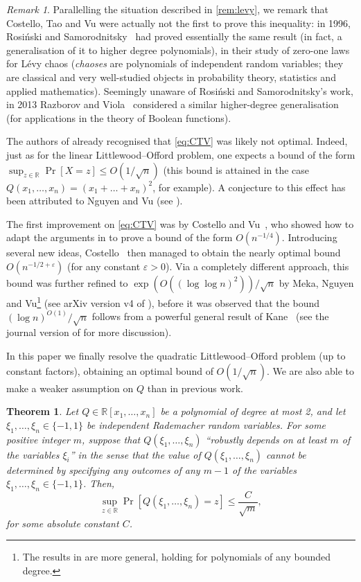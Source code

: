 \documentclass[english]{article}
\newtheorem{theorem}{Theorem}[section]
\theoremstyle{remark}
\newtheorem{remark}{Remark}[section]
\numberwithin{equation}{section}
\numberwithin{figure}{section}
\newcommand{\RR}{\mathbb{R}}
\begin{document}
\begin{remark}\label{rem:RS}
Parallelling the situation described in \cref{rem:levy}, we remark that Costello,
Tao and Vu were actually not the first to prove this inequality: in
1996, Rosi\'nski and Samorodnitsky~\cite{RS96} had proved essentially
the same result (in fact, a generalisation of it to higher degree
polynomials), in their study of zero-one laws for L\'evy chaos (\emph{chaoses} are polynomials of independent random variables; they are classical and very well-studied objects in probability theory, statistics and applied mathematics). Seemingly unaware of
Rosi\'nski and Samorodnitsky's work, in 2013 Razborov and Viola~\cite{RV13}
considered a similar higher-degree generalisation (for applications in the theory of Boolean functions).
\end{remark}

The authors of \cite{CTV06,RS96} already recognised that \cref{eq:CTV} was likely not optimal. Indeed, just as for the linear Littlewood--Offord problem, one expects a bound of the form $\sup_{z\in\RR}\Pr[X=z]\le O(1/\sqrt{n})$ (this bound is attained in the case $Q(x_{1},\dots,x_{n})=(x_{1}+\dots+x_{n})^{2}$, for example). A conjecture to this effect has been attributed to Nguyen and Vu (see \cite{MNV16,RV13}).

The first improvement on \cref{eq:CTV} was by Costello and Vu~\cite{CV08}, who showed how to adapt the arguments in \cite{CTV06} to prove a bound of the form $O(n^{-1/4})$. Introducing several new ideas, Costello~\cite{Cos13} then managed to obtain the nearly optimal bound $O(n^{-1/2+\varepsilon})$ (for
any constant $\varepsilon>0$). Via a completely different approach, this bound was further refined to
$\exp(O((\log\log n)^{2}))/\sqrt{n}$ by Meka, Nguyen and Vu\footnote{The results in \cite{MNV16} are more general, holding for polynomials of any bounded degree.} (see arXiv version v4 of \cite{MNV16}), before it was observed that the bound $(\log n)^{O(1)}/\sqrt{n}$ follows from a powerful general result of Kane~\cite{Kan14} (see the journal version of \cite{MNV16} for more discussion).

In this paper we finally resolve the quadratic Littlewood--Offord problem (up to constant factors), obtaining an optimal bound of $O(1/\sqrt{n})$. We are also able to make a weaker assumption on $Q$ than in previous
work.
\begin{theorem}\label{thm:main-shiny}
Let $Q\in\RR[x_{1},\dots,x_{n}]$ be a polynomial of degree at most 2, and let $\xi_{1},\dots,\xi_{n}\in\{-1,1\}$ be independent Rademacher random variables.
For some positive integer $m$, suppose that $Q(\xi_{1},\dots,\xi_{n})$ ``robustly depends on at least $m$ of the variables $\xi_{i}$'' in the sense that the value of $Q(\xi_{1},\dots,\xi_{n})$ cannot be determined by specifying any outcomes of any $m-1$ of the variables $\xi_{1},\dots,\xi_n\in \{-1,1\}$. Then,
\[
\sup_{z\in\RR}\Pr[Q(\xi_{1},\dots,\xi_{n})=z]\le \frac{C}{\sqrt{m}},
\]
for some absolute constant $C$.
\end{theorem}
\end{document}
